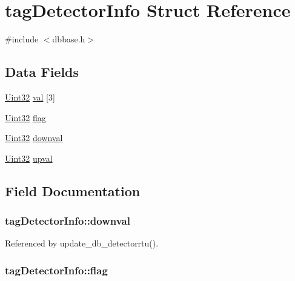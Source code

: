 \hypertarget{structtagDetectorInfo}{\section{tag\-Detector\-Info Struct Reference}
\label{structtagDetectorInfo}
}


{\ttfamily \#include $<$dbbase.\-h$>$}

\subsection*{Data Fields}
\begin{DoxyCompactItemize}
\item 
\hyperlink{base_8h_a60cf7b3c038ce37a50796e8eaddf0b5f}{Uint32} \hyperlink{structtagDetectorInfo_a7dd75ea997381e7c732247ea01ab5550}{val} \mbox{[}3\mbox{]}
\item 
\hyperlink{base_8h_a60cf7b3c038ce37a50796e8eaddf0b5f}{Uint32} \hyperlink{structtagDetectorInfo_a5f40b02bd5bd759cf9bb2496273678e7}{flag}
\item 
\hyperlink{base_8h_a60cf7b3c038ce37a50796e8eaddf0b5f}{Uint32} \hyperlink{structtagDetectorInfo_a0cfdf5123ed1d30af6bb60ad5ce0e6f7}{downval}
\item 
\hyperlink{base_8h_a60cf7b3c038ce37a50796e8eaddf0b5f}{Uint32} \hyperlink{structtagDetectorInfo_af8bb08e2acbcc9f134be7feaa0e7d2ef}{upval}
\end{DoxyCompactItemize}


\subsection{Field Documentation}
\hypertarget{structtagDetectorInfo_a0cfdf5123ed1d30af6bb60ad5ce0e6f7}{
\subsubsection[{downval}]{ tag\-Detector\-Info\-::downval}}\label{structtagDetectorInfo_a0cfdf5123ed1d30af6bb60ad5ce0e6f7}


Referenced by update\-\_\-db\-\_\-detectorrtu().

\hypertarget{structtagDetectorInfo_a5f40b02bd5bd759cf9bb2496273678e7}{
\subsubsection[{flag}]{ tag\-Detector\-Info\-::flag}}\label{structtagDetectorInfo_a5f40b02bd5bd759cf9bb2496273678e7}


